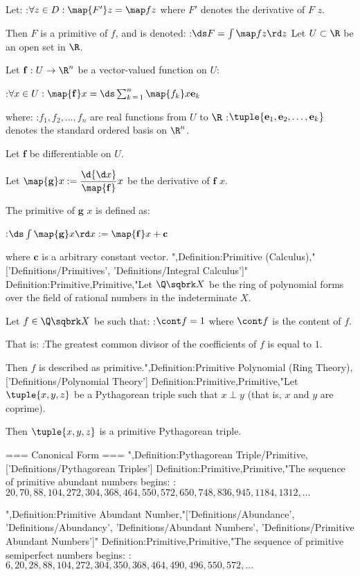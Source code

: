 Let:
:$\forall z \in D: \map {F'} z = \map f z$
where $F'$ denotes the derivative of $F$  $z$.


Then $F$ is a primitive of $f$, and is denoted:
:$\ds F = \int \map f z \rd z$
Let $U \subset \R$ be an open set in $\R$.

Let $\mathbf f: U \to \R^n$ be a vector-valued function on $U$:

:$\forall x \in U: \map {\mathbf f} x = \ds \sum_{k \mathop = 1}^n \map {f_k} x \mathbf e_k$

where:
:$f_1, f_2, \ldots, f_n$ are real functions from $U$ to $\R$
:$\tuple {\mathbf e_1, \mathbf e_2, \ldots, \mathbf e_k}$ denotes the standard ordered basis on $\R^n$.

Let $\mathbf f$ be differentiable on $U$.


Let $\map {\mathbf g} x := \dfrac \d {\d x} \map {\mathbf f} x$ be the derivative of $\mathbf f$  $x$.


The primitive of $\mathbf g$  $x$ is defined as:

:$\ds \int \map {\mathbf g} x \rd x := \map {\mathbf f} x + \mathbf c$

where $\mathbf c$ is a arbitrary constant vector.
",Definition:Primitive (Calculus),"['Definitions/Primitives', 'Definitions/Integral Calculus']"
Definition:Primitive,Primitive,"Let $\Q \sqbrk X$ be the ring of polynomial forms over the field of rational numbers in the indeterminate $X$.

Let $f \in \Q \sqbrk X$ be such that:
:$\cont f = 1$
where $\cont f$ is the content of $f$.


That is:
:The greatest common divisor of the coefficients of $f$ is equal to $1$.



Then $f$ is described as primitive.",Definition:Primitive Polynomial (Ring Theory),['Definitions/Polynomial Theory']
Definition:Primitive,Primitive,"Let $\tuple {x, y, z}$ be a Pythagorean triple such that $x \perp y$ (that is, $x$ and $y$ are coprime).

Then $\tuple {x, y, z}$ is a primitive Pythagorean triple.


=== Canonical Form ===
",Definition:Pythagorean Triple/Primitive,['Definitions/Pythagorean Triples']
Definition:Primitive,Primitive,"The sequence of primitive abundant numbers begins:
:$20, 70, 88, 104, 272, 304, 368, 464, 550, 572, 650, 748, 836, 945, 1184, 1312, \ldots$


",Definition:Primitive Abundant Number,"['Definitions/Abundance', 'Definitions/Abundancy', 'Definitions/Abundant Numbers', 'Definitions/Primitive Abundant Numbers']"
Definition:Primitive,Primitive,"The sequence of primitive semiperfect numbers begins:
:$6, 20, 28, 88, 104, 272, 304, 350, 368, 464, 490, 496, 550, 572, \ldots$


